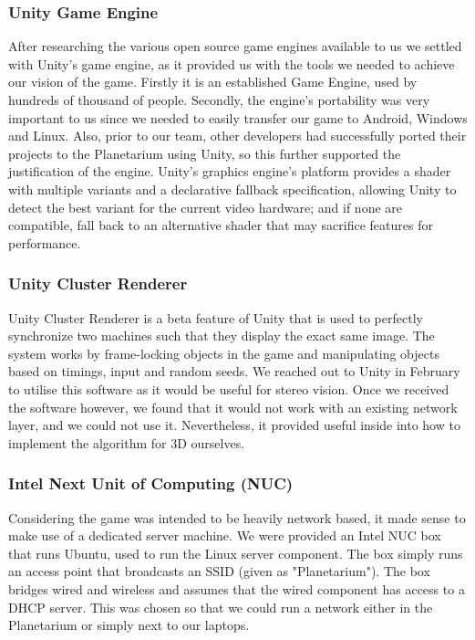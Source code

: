 \documentclass[11pt,a4paper]{article}
\begin{document}
 \subsubsection{Unity Game Engine}

 After researching the various open source game engines available to us we settled with Unity’s game engine, as it provided us with the tools we needed to achieve our vision of the game. Firstly it is an established Game Engine, used by hundreds of thousand of people. Secondly, the engine's portability was very important to us since we needed to easily transfer our game to Android, Windows and Linux. Also, prior to our team, other developers had successfully ported their projects to the Planetarium using Unity, so this further supported the justification of the engine. Unity's graphics engine's platform provides a shader with multiple variants and a declarative fallback specification, allowing Unity to detect the best variant for the current video hardware; and if none are compatible, fall back to an alternative shader that may sacrifice features for performance.

 \subsubsection{ Unity Cluster Renderer}
Unity Cluster Renderer is a beta feature of Unity that is used to perfectly synchronize two machines such that they display the exact same image. The system works by frame-locking objects in the game and manipulating objects based on timings, input and random seeds. We reached out to Unity in February to utilise this software as it would be useful for stereo vision. Once we received the software however, we found that it would not work with an existing network layer, and we could not use it. Nevertheless, it provided useful inside into how to implement the algorithm for 3D ourselves.

 \subsubsection{ Intel Next Unit of Computing (NUC)}
Considering the game was intended to be heavily network based, it made sense to make use of a dedicated server machine. We were provided an Intel NUC box that runs Ubuntu, used to run the Linux server component. The box simply runs an access point that broadcasts an SSID (given as "Planetarium"). The box bridges wired and wireless and assumes that the wired component has access to a DHCP server. This was chosen so that we could run a network either in the Planetarium or simply next to our laptops.
\end{document}

